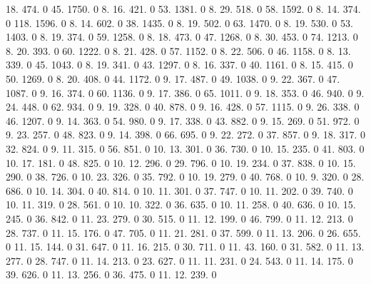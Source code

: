 18. 474. 0 45. 1750. 0 8. 16. 421. 0 53. 1381. 0 8. 29. 518. 0 58. 1592. 0 8. 14. 374. 0 118. 1596. 0 8. 14. 602. 0 38. 1435. 0 8. 19. 502. 0 63. 1470. 0 8. 19. 530. 0 53. 1403. 0 8. 19. 374. 0 59. 1258. 0 8. 18. 473. 0 47. 1268. 0 8. 30. 453. 0 74. 1213. 0 8. 20. 393. 0 60. 1222. 0 8. 21. 428. 0 57. 1152. 0 8. 22. 506. 0 46. 1158. 0 8. 13. 339. 0 45. 1043. 0 8. 19. 341. 0 43. 1297. 0 8. 16. 337. 0 40. 1161. 0 8. 15. 415. 0 50. 1269. 0 8. 20. 408. 0 44. 1172. 0 9. 17. 487. 0 49. 1038. 0 9. 22. 367. 0 47. 1087. 0 9. 16. 374. 0 60. 1136. 0 9. 17. 386. 0 65. 1011. 0 9. 18. 353. 0 46. 940. 0 9. 24. 448. 0 62. 934. 0 9. 19. 328. 0 40. 878. 0 9. 16. 428. 0 57. 1115. 0 9. 26. 338. 0 46. 1207. 0 9. 14. 363. 0 54. 980. 0 9. 17. 338. 0 43. 882. 0 9. 15. 269. 0 51. 972. 0 9. 23. 257. 0 48. 823. 0 9. 14. 398. 0 66. 695. 0 9. 22. 272. 0 37. 857. 0 9. 18. 317. 0 32. 824. 0 9. 11. 315. 0 56. 851. 0 10. 13. 301. 0 36. 730. 0 10. 15. 235. 0 41. 803. 0 10. 17. 181. 0 48. 825. 0 10. 12. 296. 0 29. 796. 0 10. 19. 234. 0 37. 838. 0 10. 15. 290. 0 38. 726. 0 10. 23. 326. 0 35. 792. 0 10. 19. 279. 0 40. 768. 0 10. 9. 320. 0 28. 686. 0 10. 14. 304. 0 40. 814. 0 10. 11. 301. 0 37. 747. 0 10. 11. 202. 0 39. 740. 0 10. 11. 319. 0 28. 561. 0 10. 10. 322. 0 36. 635. 0 10. 11. 258. 0 40. 636. 0 10. 15. 245. 0 36. 842. 0 11. 23. 279. 0 30. 515. 0 11. 12. 199. 0 46. 799. 0 11. 12. 213. 0 28. 737. 0 11. 15. 176. 0 47. 705. 0 11. 21. 281. 0 37. 599. 0 11. 13. 206. 0 26. 655. 0 11. 15. 144. 0 31. 647. 0 11. 16. 215. 0 30. 711. 0 11. 43. 160. 0 31. 582. 0 11. 13. 277. 0 28. 747. 0 11. 14. 213. 0 23. 627. 0 11. 11. 231. 0 24. 543. 0 11. 14. 175. 0 39. 626. 0 11. 13. 256. 0 36. 475. 0 11. 12. 239. 0 